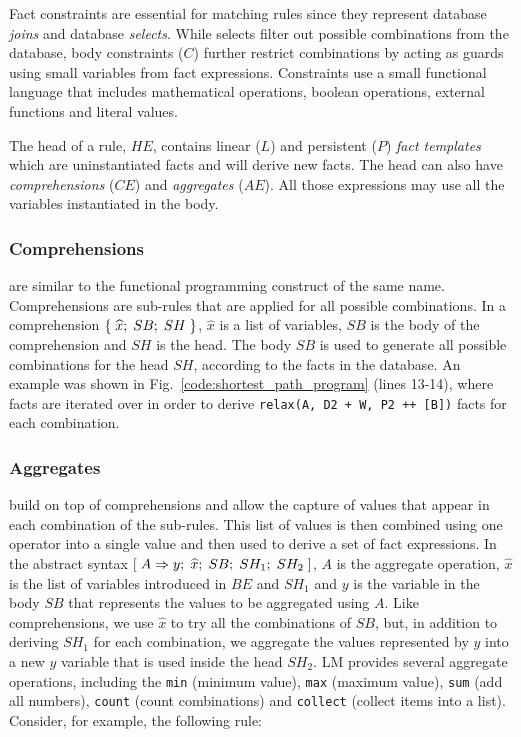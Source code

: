 Fact constraints are essential
for matching rules since they represent database \emph{joins} and database
\emph{selects}.
While selects filter out possible combinations from the database,
body constraints ($C$) further restrict combinations by acting as guards using
small variables from fact expressions. Constraints use a small
functional language that includes mathematical
operations, boolean operations, external functions and literal values.

The head of a rule, $HE$, contains linear ($L$) and persistent ($P$) \emph{fact
   templates} which are uninstantiated facts and will derive new facts. The head
   can also have \emph{comprehensions} ($CE$) and \emph{aggregates} ($AE$). All
   those expressions may use all the variables instantiated in the body.

\subsubsection{Comprehensions} are similar to the functional programming
construct of the same name.  Comprehensions are sub-rules that are applied
for all possible combinations. In a comprehension
$\{ \; \widehat{x}; \; SB; \; SH \; \}$, $\widehat{x}$ is a list of variables,
$SB$ is the body of the comprehension and $SH$ is the head. The body $SB$ is
used to generate all possible combinations for the head $SH$, according to the
facts in the database.  An example was shown in
Fig.~\ref{code:shortest_path_program} (lines 13-14), where  facts are iterated over in order to derive \texttt{relax(A, D2 + W,
         P2 ++ [B])} facts for each combination.

\subsubsection{Aggregates}
build on top of comprehensions and allow the capture of values that
appear in each combination of the sub-rules. This list of values is then
combined using one operator into a single value and then used to derive a set of
fact expressions. In the abstract syntax
$[\; A \Rightarrow y; \; \widehat{x}; \; SB; \; SH_1; \; SH_2 \;]$, $A$ is the aggregate operation,
$\widehat{x}$ is the list of variables introduced in $BE$ and $SH_1$ and $y$ is
the variable in the body $SB$ that represents the values to be aggregated using
$A$. Like comprehensions, we use $\widehat{x}$ to try all the combinations of
$SB$, but, in addition to deriving $SH_1$ for each combination, we aggregate the
values represented by $y$ into a new $y$ variable that is used inside the head
$SH_2$.  LM provides several aggregate operations, including the \texttt{min}
(minimum value), \texttt{max} (maximum value), \texttt{sum} (add all numbers),
\texttt{count} (count combinations) and \texttt{collect} (collect items into a
list). Consider, for example, the following rule:


